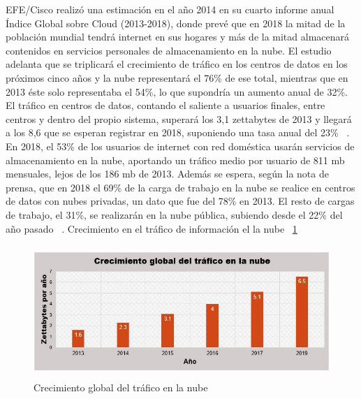 EFE/Cisco realizó una estimación en el año 2014 en su cuarto informe anual Índice Global sobre Cloud (2013-2018), donde prevé que en 2018 la mitad de la población mundial tendrá internet en sus hogares y más de la mitad almacenará contenidos en servicios personales de almacenamiento en la nube. El estudio adelanta que se triplicará el crecimiento de tráfico en los centros de datos en los próximos cinco años y la nube representará el 76\% de ese total, mientras que en 2013 éste solo representaba el 54\%, lo que supondría un aumento anual de 32\%. El tráfico en centros de datos, contando el saliente a usuarios finales, entre centros y dentro del propio sistema, superará los 3,1 zettabytes de 2013 y llegará a los 8,6 que se esperan registrar en 2018, suponiendo una tasa anual del 23\% ~\cite{cisco}. 
\\ 
En 2018, el 53\% de los usuarios de internet con red doméstica usarán servicios de almacenamiento en la nube, aportando un tráfico medio por usuario de 811 mb mensuales, lejos de los 186 mb de 2013. Además se espera, según la nota de prensa, que en 2018 el 69\% de la carga de trabajo en la nube se realice en centros de datos con nubes privadas, un dato que fue del 78\% en 2013. El resto de cargas de trabajo, el 31\%, se realizarán en la nube pública, subiendo desde el 22\% del año pasado ~\cite{cisco}. Crecimiento en el tráfico de información el la nube ~\ref{fig:1-2-1} \\

\begin{figure}[H]
\centering
	\includegraphics[width=13cm, height=5cm]{./images/crecimientoNube.jpg}
	\caption{Crecimiento global del tráfico en la nube}
	\label{fig:1-2-1}
\end{figure}

